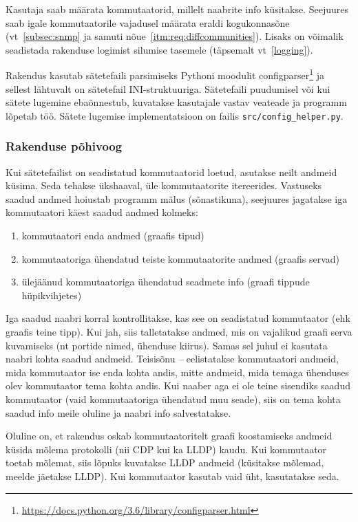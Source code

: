 \documentclass[12pt]{article}
\begin{document}
Kasutaja saab määrata kommutaatorid, millelt naabrite info küsitakse.
Seejuures saab igale kommutaatorile vajadusel määrata eraldi kogukonnasõne (vt~\ref{subsec:snmp}
ja samuti nõue~\ref{itm:req:diffcommunities}).
Lisaks on võimalik seadistada rakenduse logimist silumise tasemele (täpsemalt vt~\ref{logging}).

Rakendus kasutab sätetefaili parsimiseks Pythoni moodulit
configparser\footnote{\url{https://docs.python.org/3.6/library/configparser.html}} ja sellest
lähtuvalt on sätetefail INI-struktuuriga.
Sätetefaili puudumisel või kui sätete lugemine ebaõnnestub, kuvatakse kasutajale vastav veateade
ja programm lõpetab töö.
Sätete lugemise implementatsioon on failis \texttt{src/config\_helper.py}.

\subsubsection{Rakenduse põhivoog}

Kui sätetefailist on seadistatud kommutaatorid loetud, asutakse neilt andmeid küsima.
Seda tehakse ükshaaval, üle kommutaatorite itereerides.
Vastuseks saadud andmed hoiustab programm mälus (sõnastikuna), seejuures jagatakse iga
kommutaatori käest saadud andmed kolmeks:
\begin{enumerate}
    \item kommutaatori enda andmed (graafis tipud)
    \item kommutaatoriga ühendatud teiste kommutaatorite andmed (graafis servad)
    \item ülejäänud kommutaatoriga ühendatud seadmete info (graafi tippude hüpikvihjetes)
\end{enumerate}
Iga saadud naabri korral kontrollitakse, kas see on seadistatud kommutaator (ehk graafis teine
tipp).
Kui jah, siis talletatakse andmed, mis on vajalikud graafi serva kuvamiseks (nt portide nimed,
ühenduse kiirus).
Samas sel juhul ei kasutata naabri kohta saadud andmeid.
Teisisõnu -- eelistatakse kommutaatori andmeid, mida kommutaator ise enda kohta andis,
mitte andmeid, mida temaga ühenduses olev kommutaator tema kohta andis.
Kui naaber aga ei ole teine sisendiks saadud kommutaator (vaid kommutaatoriga ühendatud muu seade),
siis on tema kohta saadud info meile oluline ja naabri info salvestatakse.

Oluline on, et rakendus oskab kommutaatoritelt graafi koostamiseks andmeid küsida mõlema
protokolli (nii CDP kui ka LLDP) kaudu.
Kui kommutaator toetab mõlemat, siis lõpuks kuvatakse LLDP andmeid (küsitakse mõlemad,
meelde jäetakse LLDP).
Kui kommutaator kasutab vaid üht, kasutatakse seda.
\end{document}
